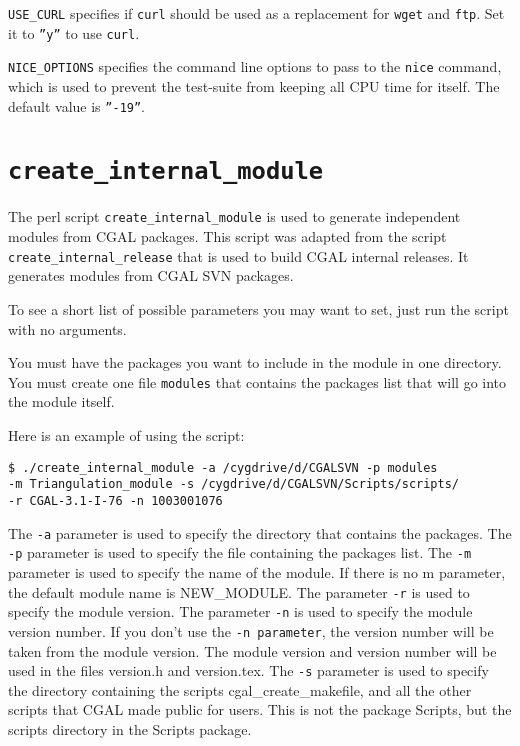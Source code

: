 {\tt USE\_CURL} specifies if {\tt curl} should be used as a replacement for
{\tt wget} and {\tt ftp}.  Set it to {\tt ''y''} to use {\tt curl}.

{\tt NICE\_OPTIONS} specifies the command line options to pass to the
{\tt nice} command, which is used to prevent the test-suite from keeping
all CPU time for itself.  The default value is {\tt ''-19''}.




\section{{\tt create\_internal\_module}}
\label{sec:create_internal_module}

The perl script {\tt create\_internal\_module} is used to generate independent
 modules from CGAL packages. This script was adapted from the script {\tt
create\_internal\_release} that is used to build CGAL internal releases.
It generates modules from CGAL SVN packages.

To see a short list of possible parameters you may want to set, just run the
script with no arguments.

You must have the packages you want to include in the module in one directory.
You must create one file {\tt modules} that contains the packages list that
will go into the module itself.

Here is an example of using the script:
\begin{verbatim}
$ ./create_internal_module -a /cygdrive/d/CGALSVN -p modules
-m Triangulation_module -s /cygdrive/d/CGALSVN/Scripts/scripts/
-r CGAL-3.1-I-76 -n 1003001076
\end{verbatim}


The {\tt -a} parameter is used to specify the directory that contains the packages.
The {\tt -p} parameter is used to specify the file containing the packages list.
The {\tt -m} parameter is used to specify the name of the module. If there is no m parameter, the default module name is NEW\_MODULE.
The parameter {\tt -r} is used to specify the module version.
The parameter {\tt -n} is used to specify the module version number. If you don't use the {\tt -n parameter}, the version number will be taken from the module version. The module version and version number will be used in the files version.h and version.tex.
The {\tt -s} parameter is used to specify the directory containing the scripts cgal\_create\_makefile, and all the other scripts that CGAL made public for users. This is not the package Scripts, but the scripts directory in the Scripts package.

